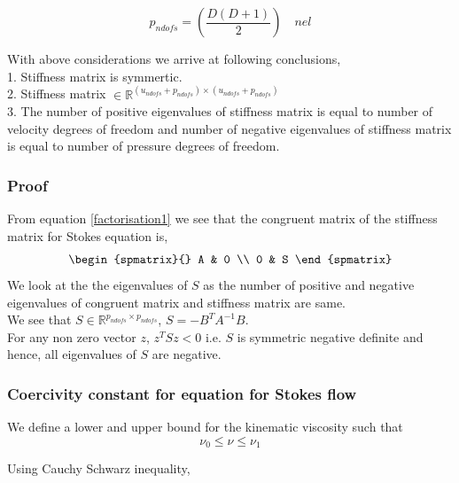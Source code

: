 \documentclass[a4paper]{book}
\begin{document}
\begin{equation} \label{pndofs}
p_{ndofs} = \left(\frac{D(D+1)}{2}\right) \quad nel
\end{equation}

With above considerations we arrive at following conclusions, \\

1. Stiffness matrix is symmertic. \\
2. Stiffness matrix $ \in \mathbb{R}^{(u_{ndofs} + p_{ndofs}) \times (u_{ndofs} + p_{ndofs})}$\\
3. The number of positive eigenvalues of stiffness matrix is equal to number of velocity degrees of freedom and number of negative eigenvalues of stiffness matrix is equal to number of pressure degrees of freedom.\\

\subsubsection{Proof}

From equation \eqref{factorisation1} we see that the congruent matrix of the stiffness matrix for Stokes equation is,
\begin{equation}
\begin{spmatrix}{}
    A & 0 \\
    0 & S
\end{spmatrix}
\end{equation}
We look at the the eigenvalues of $S$ as the number of positive and negative eigenvalues of congruent matrix and stiffness matrix are same.\\
We see that $S \in \mathbb{R}^{p_{ndofs} \times p_{ndofs}}$, $S = - B^T A^{-1} B$.\\ 
For any non zero vector $z$, $z^T S z < 0$ i.e. $S$ is symmetric negative definite and hence, all eigenvalues of $S$ are negative.

\subsubsection{Coercivity constant for equation for Stokes flow} \label{basics}

We define a lower and upper bound for the kinematic viscosity such that \\
\begin{equation}
\nu_0 \leq \nu \leq \nu_1
\end{equation}

Using Cauchy Schwarz inequality, 
\end{document}
